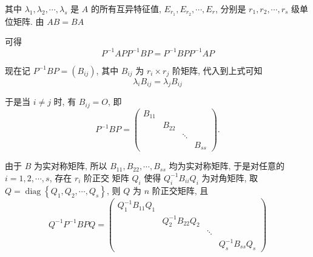 \documentclass{article}
\begin{document}
其中 $\lambda_{1}, \lambda_{2}, \cdots, \lambda_{s}$ 是 $A$ 的所有互异特征值, $E_{r_{1}}, E_{r_{2}}, \cdots, E_{r}$, 分别是 $r_{1}, r_{2}, \cdots, r_{s}$ 级单位矩阵. 由 $A B=B A$

可得
$$P^{-1} A P P^{-1} B P=P^{-1} B P P^{-1} A P$$

现在记 $P^{-1} B P=\left(B_{i j}\right)$, 其中 $B_{i j}$ 为 $r_{i} \times r_{j}$ 阶矩阵, 代入到上式可知
$$
    \lambda_{i} B_{i j}=\lambda_{j} B_{i j}
$$

于是当 $i \neq j$ 时, 有 $B_{i j}=O$, 即
$$
    P^{-1} B P=\left(\begin{array}{cccc}
            B_{11} &        &        &         \\
                   & B_{22} &        &         \\
                   &        & \ddots &         \\
                   &        &        & B_{s s}
        \end{array}\right) .
$$

由于 $B$ 为实对称矩阵, 所以 $B_{11}, B_{22}, \cdots, B_{s s}$ 均为实对称矩阵, 于是对任意的 $i=1,2, \cdots, s$, 存在 $r_{i}$ 阶正交 矩阵 $Q_{i}$ 使得 $Q_{i}^{-1} B_{i i} Q_{i}$ 为对角矩阵, 取 $Q=\operatorname{diag}\left\{Q_{1}, Q_{2}, \cdots, Q_{s}\right\}$, 则 $Q$ 为 $n$ 阶正交矩阵, 且
$$
    Q^{-1} P^{-1} B P Q=\left(\begin{array}{llll}
            Q_{1}^{-1} B_{11} Q_{1} &                         &        &                          \\
                                    & Q_{2}^{-1} B_{22} Q_{2} &        &                          \\
                                    &                         & \ddots &                          \\
                                    &                         &        & Q_{s}^{-1} B_{s s} Q_{s}
        \end{array}\right)
$$
\end{document}
